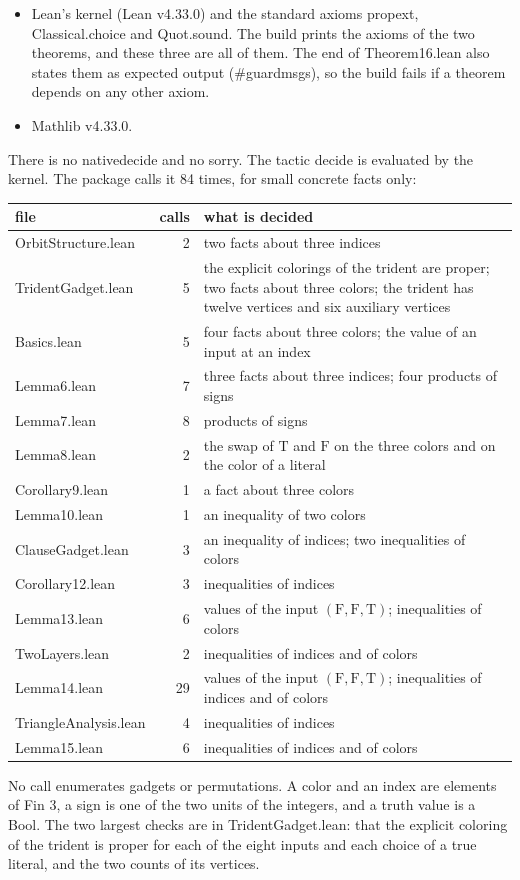 \documentclass[11pt,a4paper]{article}
\newcommand{\leanus}{\textunderscore\allowbreak}
\newcommand{\lean}[1]{{\ttfamily\let\_\leanus #1}}
\newcommand{\T}{\mathrm{T}}
\newcommand{\F}{\mathrm{F}}
\begin{document}
\begin{itemize}
\item Lean's kernel (Lean v4.33.0) and the standard axioms \lean{propext},
\lean{Classical.choice} and \lean{Quot.sound}. The build prints the axioms of
the two theorems, and these three are all of them. The end of
\lean{Theorem16.lean} also states them as expected output
(\lean{\#guard\_msgs}), so the build fails if a theorem depends on any other
axiom.
\item Mathlib v4.33.0.
\end{itemize}
There is no \lean{native\_decide} and no \lean{sorry}. The tactic
\lean{decide} is evaluated by the kernel. The package calls it
84 times, for small concrete facts only:
\begin{center}
\begin{tabular}{@{}lrp{}@{}}
\toprule
file & calls & what is decided\\
\midrule
\lean{OrbitStructure.lean} & 2 & two facts about three indices\\
\lean{TridentGadget.lean} & 5 & the explicit colorings of the trident are proper; two facts about three colors; the trident has twelve vertices and six auxiliary vertices\\
\lean{Basics.lean} & 5 & four facts about three colors; the value of an input at an index\\
\lean{Lemma6.lean} & 7 & three facts about three indices; four products of signs\\
\lean{Lemma7.lean} & 8 & products of signs\\
\lean{Lemma8.lean} & 2 & the swap of $\T$ and $\F$ on the three colors and on the color of a literal\\
\lean{Corollary9.lean} & 1 & a fact about three colors\\
\lean{Lemma10.lean} & 1 & an inequality of two colors\\
\lean{ClauseGadget.lean} & 3 & an inequality of indices; two inequalities of colors\\
\lean{Corollary12.lean} & 3 & inequalities of indices\\
\lean{Lemma13.lean} & 6 & values of the input $(\F,\F,\T)$; inequalities of colors\\
\lean{TwoLayers.lean} & 2 & inequalities of indices and of colors\\
\lean{Lemma14.lean} & 29 & values of the input $(\F,\F,\T)$; inequalities of indices and of colors\\
\lean{TriangleAnalysis.lean} & 4 & inequalities of indices\\
\lean{Lemma15.lean} & 6 & inequalities of indices and of colors\\
\bottomrule
\end{tabular}
\end{center}
No call enumerates gadgets or permutations. A color and an index are
elements of \lean{Fin 3}, a sign is one of the two units of the integers,
and a truth value is a \lean{Bool}. The two largest checks are in
\lean{TridentGadget.lean}: that the explicit coloring of the trident is
proper for each of the eight inputs and each choice of a true literal, and
the two counts of its vertices.
\end{document}
